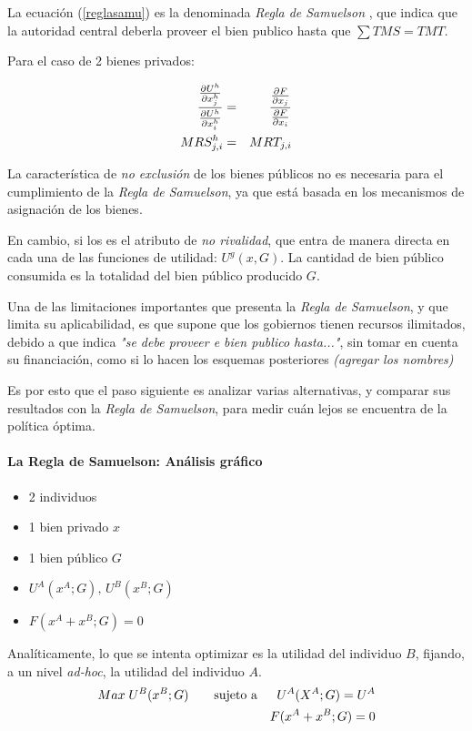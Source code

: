 La ecuación (\ref{reglasamu}) es la denominada \emph{Regla de Samuelson} , que indica que la autoridad central deberla proveer el bien publico hasta que $\sum TMS=TMT$.

Para el caso de 2 bienes privados:

\begin{eqnarray}
 \frac{\frac{\partial U^h}{\partial x_j^h}}{{\frac{\partial U^h}{\partial x^h_i}}} &=& \frac{\frac{\partial F}{\partial x_j}}{\frac{\partial F}{\partial x_i}} \nonumber \\
 MRS_{j,i}^h &=& MRT_{j,i}	
\end{eqnarray}

La característica de \textit{no exclusión} de los bienes públicos no es necesaria para el cumplimiento de la \emph{Regla de Samuelson}, ya que está basada en los mecanismos de asignación de los bienes. 

En cambio, si los es el atributo de \textit{no rivalidad}, que entra de manera directa en cada una de las funciones de utilidad: $U^g (x,G)$. La cantidad de bien público consumida es la totalidad del bien público producido $G$.

Una de las limitaciones importantes que presenta la \emph{Regla de Samuelson}, y que limita su aplicabilidad, es que supone que los gobiernos tienen recursos ilimitados, debido a que indica \textit{"se debe proveer  e bien publico hasta..."}, sin tomar en cuenta su financiación, como si lo hacen los esquemas posteriores \emph{(agregar los nombres)}

Es por esto que el paso siguiente es analizar varias alternativas, y comparar sus resultados con la \emph{Regla de Samuelson}, para medir cuán lejos se encuentra de la política óptima.

\paragraph{La Regla de Samuelson: Análisis gráfico}

\begin{itemize}
	\item 2 individuos
	\item 1 bien privado $x$
	\item 1 bien público $G$
	\item $U^A(x^A;G), \, U^B(x^B;G)$
	\item $F(x^A+x^B;G)=0$
\end{itemize}
Analíticamente, lo que se intenta optimizar es la utilidad del individuo $B$, fijando, a un nivel \textit{ad-hoc}, la utilidad del individuo $A$.
\begin{eqnarray}
Max \; U^B(x^B;G) \qquad \textrm{sujeto a} && U^A(X^A;G)= U^A \nonumber\\
	&& F(x^A+x^B;G)=0  \nonumber
\end{eqnarray}

